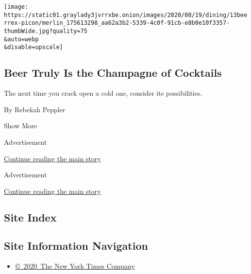 \begin{enumerate}
  \texttt{[image: https://static01.graylady3jvrrxbe.onion/images/2020/08/19/dining/13beerrex-picon/merlin\_175613298\_aa62a3b2-5339-4c0f-91cb-e8b0e10f3357-thumbWide.jpg?quality=75\\\&auto=webp\\\&disable=upscale]}

  \hypertarget{beer-truly-is-the-champagne-of-cocktails}{%
  \subsection{Beer Truly Is the Champagne of
  Cocktails}\label{beer-truly-is-the-champagne-of-cocktails}}

  The next time you crack open a cold one, consider its possibilities.

  By Rebekah Peppler
\end{enumerate}

Show More

Advertisement

\protect\hyperlink{after-mid2}{Continue reading the main story}

Advertisement

\protect\hyperlink{after-mktg}{Continue reading the main story}

\hypertarget{site-index}{%
\subsection{Site Index}\label{site-index}}

\hypertarget{site-information-navigation}{%
\subsection{Site Information
Navigation}\label{site-information-navigation}}

\begin{itemize}
\tightlist
\item
  \href{https://help.nytimes3xbfgragh.onion/hc/en-us/articles/115014792127-Copyright-notice}{©~2020~The
  New York Times Company}
\end{itemize}

